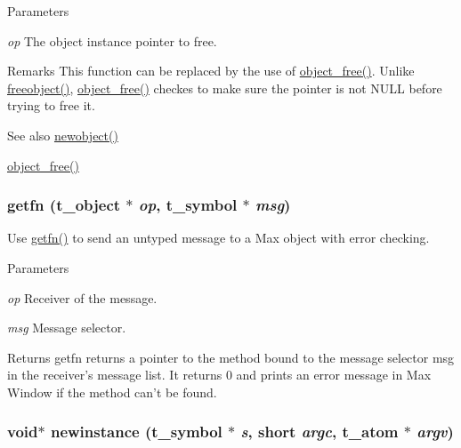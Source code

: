 \begin{DoxyParams}{Parameters}
\item[{\em op}]The object instance pointer to free.\end{DoxyParams}
\begin{DoxyRemark}{Remarks}
This function can be replaced by the use of \hyperlink{group__obj_ga3759846cb356195532c41e35b87522ee}{object\_\-free()}. Unlike \hyperlink{group__class__old_gadf30646e52376a37b93cc20efac65636}{freeobject()}, \hyperlink{group__obj_ga3759846cb356195532c41e35b87522ee}{object\_\-free()} checkes to make sure the pointer is not NULL before trying to free it.
\end{DoxyRemark}
\begin{DoxySeeAlso}{See also}
\hyperlink{group__class__old_ga053f428d5edcc7d663980330848e73a6}{newobject()} 

\hyperlink{group__obj_ga3759846cb356195532c41e35b87522ee}{object\_\-free()} 
\end{DoxySeeAlso}
\hypertarget{group__class__old_gafa477f96b3a02c0ecbca2b5aa14b9ecb}{
\subsubsection[{getfn}]{ getfn ({\bf t\_\-object} $\ast$ {\em op}, \/  {\bf t\_\-symbol} $\ast$ {\em msg})}}
\label{group__class__old_gafa477f96b3a02c0ecbca2b5aa14b9ecb}


Use \hyperlink{group__class__old_gafa477f96b3a02c0ecbca2b5aa14b9ecb}{getfn()} to send an untyped message to a Max object with error checking. 
\begin{DoxyParams}{Parameters}
\item[{\em op}]Receiver of the message. \item[{\em msg}]Message selector. \end{DoxyParams}
\begin{DoxyReturn}{Returns}
getfn returns a pointer to the method bound to the message selector msg in the receiver’s message list. It returns 0 and prints an error message in Max Window if the method can’t be found. 
\end{DoxyReturn}
\hypertarget{group__class__old_ga4c1f100a92d6f519ba4e93665ff54998}{
\subsubsection[{newinstance}]{\setlength{\rightskip}{0pt plus 5cm}void$\ast$ newinstance ({\bf t\_\-symbol} $\ast$ {\em s}, \/  short {\em argc}, \/  {\bf t\_\-atom} $\ast$ {\em argv})}}
\label{group__class__old_ga4c1f100a92d6f519ba4e93665ff54998}


